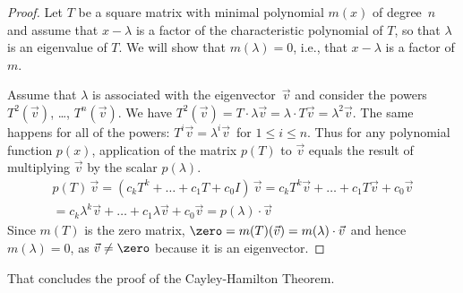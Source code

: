 \begin{proof}
Let \( T \) be a square matrix with minimal polynomial \( m(x) \) 
of degree~\( n \) and 
assume that \( x-\lambda \) is a factor of the characteristic polynomial of 
\( T \), so that \( \lambda \) is an eigenvalue of \( T \).
We will show that $m(\lambda)=0$, i.e., that $x-\lambda$ is a factor of $m$.

Assume that $\lambda$ is associated with the eigenvector~$\vec{v}$ and
consider the powers $T^2(\vec{v})$, \ldots, \( T^n(\vec{v}) \).
We have
$T^2(\vec{v})
=T\cdot\lambda\vec{v}=\lambda\cdot T\vec{v}=\lambda^2\vec{v}$.
The same happens for all of the powers: 
$T^i\vec{v}=\lambda^i\vec{v}\,$ for \( 1\leq i \leq n \).
Thus
for any polynomial function \( p(x) \), application of the matrix \( p(T) \)
to \( \vec{v} \) equals the result of multiplying \( \vec{v} \) by the scalar
\( p(\lambda) \).
\begin{multline*}
  p(T)\,\vec{v}
  =(c_kT^k+\dots+c_1T+c_0I)\,\vec{v}
  =c_kT^k\vec{v}+\dots+c_1T\vec{v}+c_0\vec{v}  \\
  =c_k\lambda^k\vec{v}+\dots+c_1\lambda\vec{v}+c_0\vec{v}
  =p(\lambda)\cdot\vec{v}
\end{multline*}
Since \( m(T) \) is the zero matrix,
\( \zero=m(T)(\vec{v})=m(\lambda)\cdot\vec{v} \) and
hence \( m(\lambda)=0 \), as \( \vec{v}\neq\zero \) 
because it is an eigenvector.
\end{proof}

That concludes the proof of the Cayley-Hamilton Theorem.

